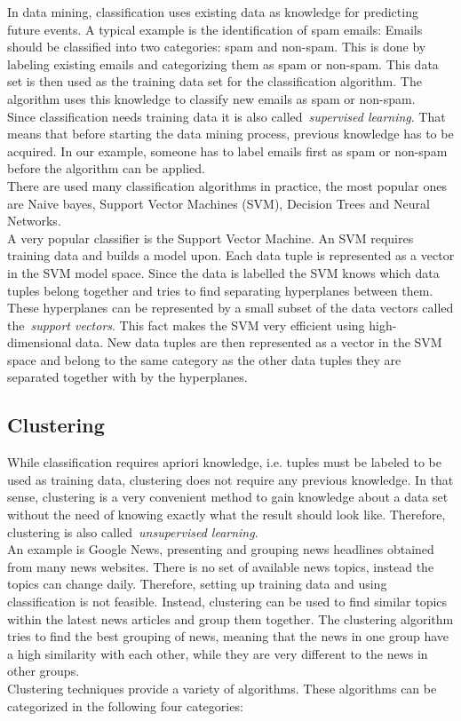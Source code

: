 In data mining, classification uses existing data as knowledge for predicting future events. A typical example is the identification of spam emails: Emails should be classified into two categories: spam and non-spam. This is done by labeling existing emails and categorizing them as spam or non-spam. This data set is then used as the training data set for the classification algorithm. The algorithm uses this knowledge to classify new emails as spam or non-spam.
\\
Since classification needs training data it is also called~\emph{supervised learning}. That means that before starting the data mining process, previous knowledge has to be acquired. In our example, someone has to label emails first as spam or non-spam before the algorithm can be applied. 
\\
There are used many classification algorithms in practice, the most popular ones are Naive bayes, Support Vector Machines (SVM), Decision Trees and Neural Networks.
\\
A very popular classifier is the Support Vector Machine. An SVM requires training data and builds a model upon. Each data tuple is represented as a vector in the SVM model space. Since the data is labelled the SVM knows which data tuples belong together and tries to find separating hyperplanes between them. These hyperplanes can be represented by a small subset of the data vectors called the~\emph{support vectors}. This fact makes the SVM very efficient using high-dimensional data. New data tuples are then represented as a vector in the SVM space and belong to the same category as the other data tuples they are separated together with by the hyperplanes.

\subsection{Clustering}

While classification requires apriori knowledge, i.e. tuples must be labeled to be used as training data, clustering does not require any previous knowledge. In that sense, clustering is a very convenient method to gain knowledge about a data set without the need of knowing exactly what the result should look like. Therefore, clustering is also called~\emph{unsupervised learning}.
\\
An example is Google News, presenting and grouping news headlines obtained from many news websites. There is no set of available news topics, instead the topics can change daily. Therefore, setting up training data and using classification is not feasible. Instead, clustering can be used to find similar topics within the latest news articles and group them together. The clustering algorithm tries to find the best grouping of news, meaning that the news in one group have a high similarity with each other, while they are very different to the news in other groups. 
\\
Clustering techniques provide a variety of algorithms. These algorithms can be categorized in the following four categories:

